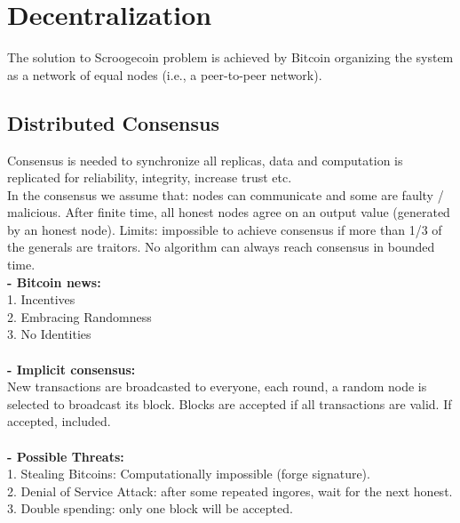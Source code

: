 \documentclass{article}
\begin{document}
\section{Decentralization}
The solution to Scroogecoin problem is achieved by Bitcoin organizing the system as a network of equal nodes (i.e., a peer-to-peer network).
\subsection{Distributed Consensus}
Consensus is needed to synchronize all replicas, data and computation is replicated for reliability, integrity, increase trust etc. \\
In the consensus we assume that: nodes can communicate and some are faulty / malicious. After finite time, all honest nodes agree on an output value (generated by an honest node). Limits: impossible to achieve consensus if more than 1/3 of the generals are traitors. No algorithm can always reach consensus in bounded time.\\
\textbf{- Bitcoin news: }\\
1. Incentives\\
2. Embracing Randomness\\
3. No Identities\\\\
\textbf{- Implicit consensus: }\\
New transactions are broadcasted to everyone, each round, a random node is selected to broadcast its block. Blocks are accepted if all transactions are valid. If accepted, included.\\\\
\textbf{- Possible Threats: }\\
1. Stealing Bitcoins: Computationally impossible (forge signature).\\
2. Denial of Service Attack: after some repeated ingores, wait for the next honest.\\
3. Double spending: only one block will be accepted.\\
\end{document}

